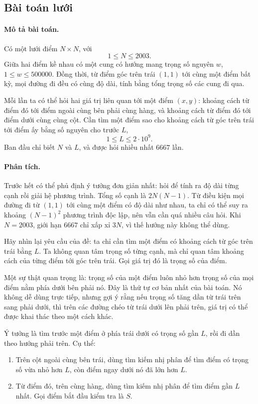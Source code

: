 \documentclass[11pt]{article}
\begin{document}
\subsection{Bài toán lưới}

\paragraph{Mô tả bài toán.}
Có một lưới điểm $N\times N$, với
\[
  1\le N\le 2003.
\]
Giữa hai điểm kề nhau có một cung có hướng mang trọng số nguyên $w$,
$1\le w\le 500000$. Đồng thời, từ điểm góc trên trái $(1,1)$ tới cùng một
điểm bất kỳ, mọi đường đi đều có cùng độ dài, tính bằng tổng trọng số các cung
đi qua.

Mỗi lần ta có thể hỏi hai giá trị liên quan tới một điểm $(x,y)$: khoảng cách
từ điểm đó tới điểm ngoài cùng bên phải cùng hàng, và khoảng cách từ điểm đó
tới điểm dưới cùng cùng cột. Cần tìm một điểm sao cho khoảng cách từ góc trên
trái tới điểm ấy bằng số nguyên cho trước $L$,
\[
  1\le L\le 2\cdot 10^9.
\]
Ban đầu chỉ biết $N$ và $L$, và được hỏi nhiều nhất $6667$ lần.

\paragraph{Phân tích.}
Trước hết có thể phủ định ý tưởng đơn giản nhất: hỏi để tính ra độ dài từng
cạnh rồi giải hệ phương trình. Tổng số cạnh là $2N(N-1)$. Từ điều kiện mọi
đường đi từ $(1,1)$ tới cùng một điểm có độ dài như nhau, ta chỉ có thể suy ra
khoảng $(N-1)^2$ phương trình độc lập, nên vẫn cần quá nhiều câu hỏi. Khi
$N=2003$, giới hạn $6667$ chỉ xấp xỉ $3N$, vì thế hướng này không thể dùng.

Hãy nhìn lại yêu cầu của đề: ta chỉ cần tìm một điểm có khoảng cách từ góc
trên trái bằng $L$. Ta không quan tâm trọng số từng cạnh, mà chỉ quan tâm
khoảng cách của từng điểm tới góc trên trái. Gọi giá trị đó là trọng số của
điểm.

Một sự thật quan trọng là: trọng số của một điểm luôn nhỏ hơn trọng số của mọi
điểm nằm phía dưới bên phải nó. Đây là thứ tự cơ bản nhất của bài toán. Nó
không dễ dùng trực tiếp, nhưng gợi ý rằng nếu trọng số tăng dần từ trái trên
sang phải dưới, thì trên các đường chéo từ trái dưới lên phải trên, giá trị
có thể được khai thác theo một cách khác.

Ý tưởng là tìm trước một điểm ở phía trái dưới có trọng số gần $L$, rồi đi dần
theo hướng phải trên. Cụ thể:
\begin{enumerate}
  \item Trên cột ngoài cùng bên trái, dùng tìm kiếm nhị phân để tìm điểm có
  trọng số vừa nhỏ hơn $L$, còn điểm ngay dưới nó đã lớn hơn $L$.
  \item Từ điểm đó, trên cùng hàng, dùng tìm kiếm nhị phân để tìm điểm gần
  $L$ nhất. Gọi điểm bắt đầu kiểm tra là $S$.
\end{enumerate}
\end{document}
